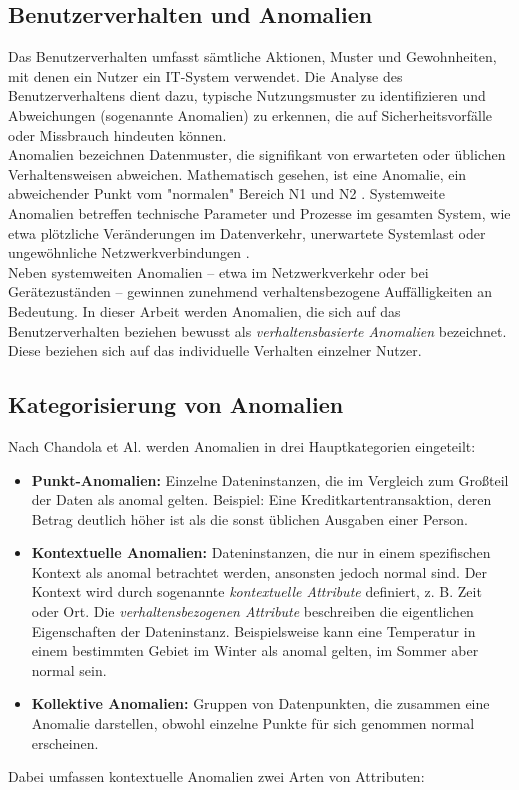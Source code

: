 \documentclass[a4paper,12pt]{article}
\begin{document}
	\subsection{Benutzerverhalten und Anomalien}
	Das Benutzerverhalten umfasst sämtliche Aktionen, Muster und Gewohnheiten, mit denen ein Nutzer ein IT-System verwendet. Die Analyse des Benutzerverhaltens dient dazu, typische Nutzungsmuster zu identifizieren und Abweichungen (sogenannte Anomalien) zu erkennen, die auf Sicherheitsvorfälle oder Missbrauch hindeuten können.
	\\[0.5em]
	Anomalien bezeichnen Datenmuster, die signifikant von erwarteten oder üblichen Verhaltensweisen abweichen. Mathematisch gesehen, ist eine Anomalie, ein abweichender Punkt vom "normalen" Bereich N1 und N2 \cite[S.2]{chandola2009anomaly}. 
	Systemweite Anomalien betreffen technische Parameter und Prozesse im gesamten System, wie etwa plötzliche Veränderungen im Datenverkehr, unerwartete Systemlast oder ungewöhnliche Netzwerkverbindungen \cite[S.2]{chandola2009anomaly}.
	\\[0.5em]
	Neben systemweiten Anomalien – etwa im Netzwerkverkehr oder bei Gerätezuständen – gewinnen zunehmend verhaltensbezogene Auffälligkeiten an Bedeutung. In dieser Arbeit werden Anomalien, die sich auf das Benutzerverhalten beziehen bewusst als \textit{verhaltensbasierte Anomalien} bezeichnet. Diese beziehen sich auf das individuelle Verhalten einzelner Nutzer.
	
	\subsection{Kategorisierung von Anomalien}
	Nach Chandola et Al. \cite[S.7]{chandola2009anomaly} werden Anomalien in drei Hauptkategorien eingeteilt:
	
	\begin{itemize}
		\item \textbf{Punkt-Anomalien:} Einzelne Dateninstanzen, die im Vergleich zum Großteil der Daten als anomal gelten. Beispiel: Eine Kreditkartentransaktion, deren Betrag deutlich höher ist als die sonst üblichen Ausgaben einer Person.
		\item \textbf{Kontextuelle Anomalien:} Dateninstanzen, die nur in einem spezifischen Kontext als anomal betrachtet werden, ansonsten jedoch normal sind. Der Kontext wird durch sogenannte \emph{kontextuelle Attribute} definiert, z. B. Zeit oder Ort. Die \emph{verhaltensbezogenen Attribute} beschreiben die eigentlichen Eigenschaften der Dateninstanz. Beispielsweise kann eine Temperatur in einem bestimmten Gebiet im Winter als anomal gelten, im Sommer aber normal sein.
		\item \textbf{Kollektive Anomalien:} Gruppen von Datenpunkten, die zusammen eine Anomalie darstellen, obwohl einzelne Punkte für sich genommen normal erscheinen.
	\end{itemize}
	Dabei umfassen kontextuelle Anomalien zwei Arten von Attributen:
	
\end{document}
